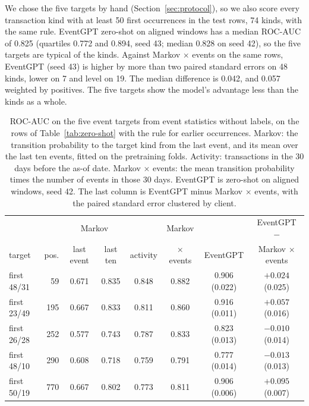 \documentclass[12pt]{article}
\begin{document}
We chose the five targets by hand (Section~\ref{sec:protocol}), so we also score every transaction kind with at least 50 first occurrences in the test rows, 74 kinds, with the same rule. EventGPT zero-shot on aligned windows has a median ROC-AUC of 0.825 (quartiles 0.772 and 0.894, seed 43; median 0.828 on seed 42), so the five targets are typical of the kinds. Against Markov $\times$ events on the same rows, EventGPT (seed 43) is higher by more than two paired standard errors on 48 kinds, lower on 7 and level on 19. The median difference is 0.042, and 0.057 weighted by positives. The five targets show the model's advantage less than the kinds as a whole.

\begin{table}[htbp]
\centering
\caption{ROC-AUC on the five event targets from event statistics without labels, on the rows of Table~\ref{tab:zero-shot} with the rule for earlier occurrences. Markov: the transition probability to the target kind from the last event, and its mean over the last ten events, fitted on the pretraining folds. Activity: transactions in the 30 days before the as-of date. Markov $\times$ events: the mean transition probability times the number of events in those 30 days. EventGPT is zero-shot on aligned windows, seed 42. The last column is EventGPT minus Markov $\times$ events, with the paired standard error clustered by client.}
\label{tab:next-event}
\footnotesize
\setlength{\tabcolsep}{3pt}
\begin{tabular}{lrcccccc}
\toprule
 & & \multicolumn{2}{c}{Markov} & & Markov & & EventGPT $-$ \\
target & pos. & last event & last ten & activity & $\times$ events & EventGPT & Markov $\times$ events \\
\midrule
first 48/31 & 59 & 0.671 & 0.835 & 0.848 & 0.882 & 0.906 (0.022) & $+0.024$ (0.025) \\
first 23/49 & 195 & 0.667 & 0.833 & 0.811 & 0.860 & 0.916 (0.011) & $+0.057$ (0.016) \\
first 26/28 & 252 & 0.577 & 0.743 & 0.787 & 0.833 & 0.823 (0.013) & $-0.010$ (0.014) \\
first 48/10 & 290 & 0.608 & 0.718 & 0.759 & 0.791 & 0.777 (0.014) & $-0.013$ (0.013) \\
first 50/19 & 770 & 0.667 & 0.802 & 0.773 & 0.811 & 0.906 (0.006) & $+0.095$ (0.007) \\
\bottomrule
\end{tabular}
\end{table}
\end{document}
